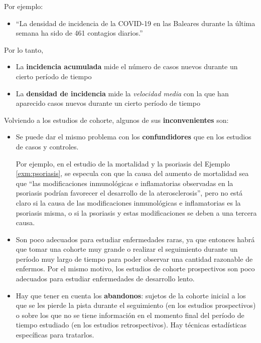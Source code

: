\documentclass[
]{book}
\providecommand{\tightlist}{%
  \setlength{\itemsep}{0pt}\setlength{\parskip}{0pt}}
\theoremstyle{definition}
\theoremstyle{definition}
\theoremstyle{definition}
\theoremstyle{definition}
\theoremstyle{remark}
\begin{document}
Por ejemplo:

\begin{itemize}
\tightlist
\item
  ``La densidad de incidencia de la COVID-19 en las Baleares durante la última semana ha sido de 461 contagios diarios.''
\end{itemize}

Por lo tanto,

\begin{itemize}
\item
  La \textbf{incidencia acumulada} mide el número de casos nuevos durante un cierto período de tiempo
\item
  La \textbf{densidad de incidencia} mide la \emph{velocidad media} con la que han aparecido casos nuevos durante un cierto período de tiempo
\end{itemize}

Volviendo a los estudios de cohorte, algunos de sus \textbf{inconvenientes} son:

\begin{itemize}
\item
  Se puede dar el mismo problema con los \textbf{confundidores} que en los estudios de casos y controles.

  Por ejemplo, en el estudio de la mortalidad y la psoriasis del Ejemplo \ref{exm:psoriasis}, se especula con que la causa del aumento de mortalidad sea que ``las modificaciones inmunológicas e inflamatorias observadas en la psoriasis podrían favorecer el desarrollo de la aterosclerosis'', pero no está claro si la causa de las modificaciones inmunológicas e inflamatorias es la psoriasis misma, o si la psoriasis y estas modificaciones se deben a una tercera causa.
\item
  Son poco adecuados para estudiar enfermedades raras, ya que entonces habrá que tomar una cohorte muy grande o realizar el seguimiento durante un período muy largo de tiempo para poder observar una cantidad razonable de enfermos. Por el mismo motivo, los estudios de cohorte prospectivos son poco adecuados para estudiar enfermedades de desarrollo lento.
\item
  Hay que tener en cuenta los \textbf{abandonos}: sujetos de la cohorte inicial a los que se les pierde la pista durante el seguimiento (en los estudios prospectivos) o sobre los que no se tiene información en el momento final del período de tiempo estudiado (en los estudios retrospectivos). Hay técnicas estadísticas específicas para tratarlos.
\end{itemize}
\end{document}
